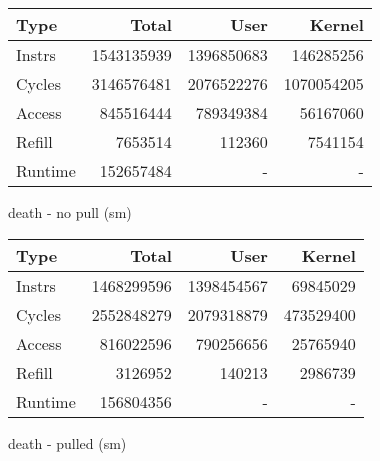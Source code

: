 \documentclass[11pt]{article}
\begin{document}
\begin{figure*}[h]
	\centering
	\begin{subtable}{.48\linewidth}
		\centering                 
		\begin{tabular}{l|rrr}
			Type    & Total      & User       & Kernel     \\
			\hline
			Instrs  & 1543135939 & 1396850683 & 146285256  \\ 
			Cycles  & 3146576481 & 2076522276 & 1070054205 \\ 
			Access  & 845516444  & 789349384  & 56167060   \\ 
			Refill  & 7653514    & 112360     & 7541154    \\ 
			Runtime & 152657484  & -          & -          \\
			\hline 
		\end{tabular}
		\caption{death - no pull (sm)}
	\end{subtable}
	\hfill
	\begin{subtable}{.48\linewidth}
		\begin{tabular}{l|rrr}
			Type    & Total      & User       & Kernel    \\
			\hline
			Instrs  & 1468299596 & 1398454567 & 69845029  \\ 
			Cycles  & 2552848279 & 2079318879 & 473529400 \\ 
			Access  & 816022596  & 790256656  & 25765940  \\ 
			Refill  & 3126952    & 140213     & 2986739   \\ 
			Runtime & 156804356  & -          & -         \\
			\hline
		\end{tabular}
		\caption{death - pulled (sm)}
	\end{subtable}
\end{figure*}
\end{document}
